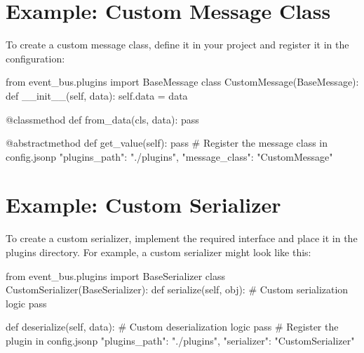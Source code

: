 \section{Example: Custom Message Class}\label{sec:example:-custom-message-class}
To create a custom message class, define it in your project and register it in the configuration:
\begin{pythoncode}
from event_bus.plugins import BaseMessage
class CustomMessage(BaseMessage):
    def __init__(self, data):
        self.data = data

    @classmethod
    def from_data(cls, data):
        pass

    @abstractmethod
    def get_value(self):
        pass
# Register the message class in config.jsonp
{
  "plugins_path": "./plugins",
  "message_class": "CustomMessage"
}
\end{pythoncode}

\section{Example: Custom Serializer}\label{sec:example:-custom-serializer}
To create a custom serializer, implement the required interface and place it in the plugins directory. For example, a custom serializer might look like this:
\begin{pythoncode}
from event_bus.plugins import BaseSerializer
class CustomSerializer(BaseSerializer):
    def serialize(self, obj):
        # Custom serialization logic
        pass

    def deserialize(self, data):
        # Custom deserialization logic
        pass
# Register the plugin in config.jsonp
{
  "plugins_path": "./plugins",
  "serializer": "CustomSerializer"
}
\end{pythoncode}
